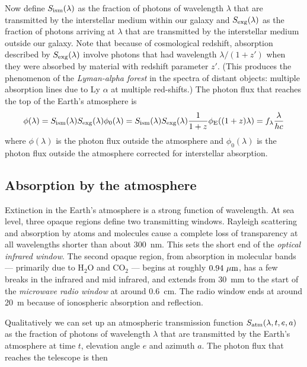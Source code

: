 Now define $S_{\rm
  ism}(\lambda)$ as the fraction of photons of wavelength $\lambda$
that are transmitted by the interstellar medium within our galaxy and
$S_{\rm exg}(\lambda)$ as the fraction of photons arriving at
$\lambda$ that are transmitted by the interstellar medium outside our
galaxy. Note that because of cosmological redshift, absorption
described by $S_{\rm exg}(\lambda)$ involve photons that had
wavelength ${\lambda/(1+z')}$ when they were absorbed by material with
  redshift parameter $z'$. (This produces the phenomenon of the {\it
    Lyman-alpha forest} in the spectra of distant objects: multiple
  absorption lines due to Ly $\alpha$ at multiple red-shifts.) The
  photon flux that reaches the top of the Earth's atmosphere is 
\[
\phi(\lambda)=S_{\rm ism}(\lambda) S_{\rm
  exg}(\lambda)\phi_0(\lambda)=S_{\rm ism}(\lambda) S_{\rm
  exg}(\lambda)\frac{1}{1+z}\phi_{\rm E}((1+z)\lambda)=f_\lambda\frac{\lambda}{hc}
\]
where $\phi(\lambda)$ is the photon flux outside the atmosphere and
$\phi_0(\lambda)$ is the photon flux outside the atmosphere corrected
for interstellar absorption. 
%
\subsection{Absorption by the atmosphere}
Extinction in the Earth's atmosphere is a strong function of
wavelength. At sea level, three opaque regions define two transmitting
windows. Rayleigh scattering and absorption by atoms and molecules
cause a complete loss of transparency at all wavelengths shorter than
about 300~nm. This sets the short end of the {\it optical infrared
  window}. The second opaque region, from absorption in molecular
bands --- primarily due to H$_2$O and CO$_2$ --- begins at roughly
$0.94~\mu{\rm m}$, has a few breaks in the infrared and mid infrared,
and extends from 30~mm to the start of the {\it microwave radio
  window} at around 0.6~cm. The radio window ends at around 20~m
because of ionospheric absorption and reflection.

Qualitatively we can set up an atmospheric transmission function
$S_{\rm atm}(\lambda,t,e,a)$ as the fraction of photons of wavelength
$\lambda$ that are transmitted by the Earth's atmosphere at time $t$,
elevation angle $e$ and azimuth $a$. The photon flux that reaches the
telescope is then

